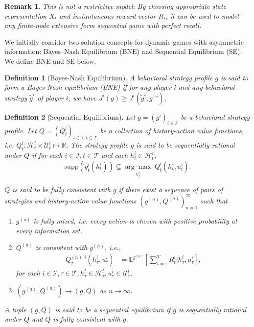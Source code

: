 \documentclass[pdflatex,sn-basic]{sn-jnl}
\newcommand{\E}{\mathbb{E}}
\newcommand{\Qfunc}{Q}
\theoremstyle{thmstyleone}%
\theoremstyle{thmstyletwo}%
\newtheorem{remark}{Remark}
\theoremstyle{thmstylethree}%
\newtheorem{defn}{Definition}
\begin{document}
\begin{remark}
	This is not a restrictive model: By choosing appropriate state representation $X_t$ and instantaneous reward vector $R_t$, it can be used to model any finite-node extensive form sequential game with perfect recall.
\end{remark}

We initially consider two solution concepts for dynamic games with asymmetric information: Bayes--Nash Equilibrium (BNE) and Sequential Equilibrium (SE). We define BNE and SE below.

\begin{defn}[Bayes-Nash Equilibrium]
A behavioral strategy profile $g$ is said to form a Bayes-Nash equilibrium (BNE) if for any player $i$ and any behavioral strategy $\tilde{g}^i$ of player $i$, we have $J^i(g)\geq J^i(\tilde{g}^i, g^{-i})$.
\end{defn}

\begin{defn}[Sequential Equilibrium]\label{def:KSEinmaintext}
	Let $g=(g^i)_{i\in\mathcal{I}}$ be a behavioral strategy profile. Let $\Qfunc=(\Qfunc_t^i)_{i\in\mathcal{I},t\in\mathcal{T}}$ be a collection of history-action value functions, i.e. $\Qfunc_t^i\colon\mathcal{H}_t^i \times \mathcal{U}_t^i \mapsto \mathbb{R}$. The strategy profile $g$ is said to be sequentially rational under $\Qfunc$ if for each $i\in\mathcal{I}, t\in\mathcal{T}$ and each $h_t^i\in\mathcal{H}_t^i$, 
	\begin{equation}
		\mathrm{supp}(g_t^i(h_t^i))\subseteq \underset{u_t^i}{\arg\max}~ \Qfunc_t^i(h_t^i, u_t^i).
	\end{equation}
	
	$\Qfunc$ is said to be fully consistent with $g$ if there exist a sequence of pairs of strategies and history-action value functions $(g^{(n)}, \Qfunc^{(n)})_{n=1}^\infty$ such that
	\begin{enumerate}[(1)]
		\item $g^{(n)}$ is fully mixed, i.e. every action is chosen with positive probability at every information set.
		\item $\Qfunc^{(n)}$ is consistent with $g^{(n)}$, i.e.,
		\begin{align}
			\Qfunc_\tau^{(n), i}(h_\tau^i, u_\tau^i)&=\E^{g^{(n)}}\left[\sum_{t=\tau}^T R_t^i\Big|h_\tau^i, u_\tau^i\right],
		\end{align}
		for each $i\in\mathcal{I}, \tau\in\mathcal{T}, h_\tau^i\in \mathcal{H}_\tau^i, u_\tau^i\in \mathcal{U}_\tau^i$.
		\item $(g^{(n)}, \Qfunc^{(n)})\rightarrow (g, \Qfunc)$ as $n\rightarrow\infty$.
	\end{enumerate}
	A tuple $(g, \Qfunc)$ is said to be a sequential equilibrium if $g$ is sequentially rational under $\Qfunc$ and $\Qfunc$ is fully consistent with $g$.
\end{defn}	
\end{document}
